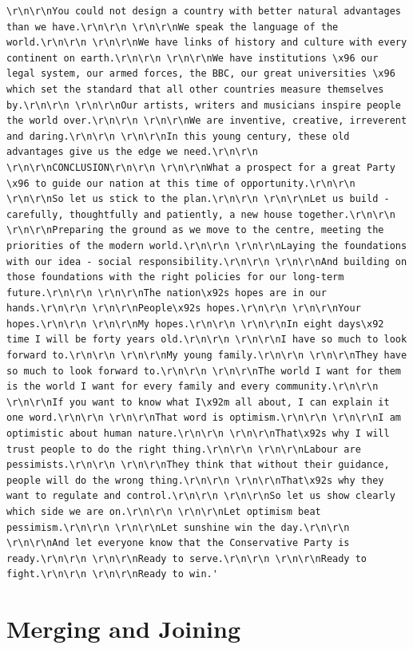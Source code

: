 \documentclass[
  letterpaper,
  DIV=11,
  numbers=noendperiod]{scrreprt}
\begin{document}
\begin{verbatim}
\r\n\r\nYou could not design a country with better natural advantages than we have.\r\n\r\n \r\n\r\nWe speak the language of the world.\r\n\r\n \r\n\r\nWe have links of history and culture with every continent on earth.\r\n\r\n \r\n\r\nWe have institutions \x96 our legal system, our armed forces, the BBC, our great universities \x96 which set the standard that all other countries measure themselves by.\r\n\r\n \r\n\r\nOur artists, writers and musicians inspire people the world over.\r\n\r\n \r\n\r\nWe are inventive, creative, irreverent and daring.\r\n\r\n \r\n\r\nIn this young century, these old advantages give us the edge we need.\r\n\r\n \r\n\r\nCONCLUSION\r\n\r\n \r\n\r\nWhat a prospect for a great Party \x96 to guide our nation at this time of opportunity.\r\n\r\n \r\n\r\nSo let us stick to the plan.\r\n\r\n \r\n\r\nLet us build - carefully, thoughtfully and patiently, a new house together.\r\n\r\n \r\n\r\nPreparing the ground as we move to the centre, meeting the priorities of the modern world.\r\n\r\n \r\n\r\nLaying the foundations with our idea - social responsibility.\r\n\r\n \r\n\r\nAnd building on those foundations with the right policies for our long-term future.\r\n\r\n \r\n\r\nThe nation\x92s hopes are in our hands.\r\n\r\n \r\n\r\nPeople\x92s hopes.\r\n\r\n \r\n\r\nYour hopes.\r\n\r\n \r\n\r\nMy hopes.\r\n\r\n \r\n\r\nIn eight days\x92 time I will be forty years old.\r\n\r\n \r\n\r\nI have so much to look forward to.\r\n\r\n \r\n\r\nMy young family.\r\n\r\n \r\n\r\nThey have so much to look forward to.\r\n\r\n \r\n\r\nThe world I want for them is the world I want for every family and every community.\r\n\r\n \r\n\r\nIf you want to know what I\x92m all about, I can explain it one word.\r\n\r\n \r\n\r\nThat word is optimism.\r\n\r\n \r\n\r\nI am optimistic about human nature.\r\n\r\n \r\n\r\nThat\x92s why I will trust people to do the right thing.\r\n\r\n \r\n\r\nLabour are pessimists.\r\n\r\n \r\n\r\nThey think that without their guidance, people will do the wrong thing.\r\n\r\n \r\n\r\nThat\x92s why they want to regulate and control.\r\n\r\n \r\n\r\nSo let us show clearly which side we are on.\r\n\r\n \r\n\r\nLet optimism beat pessimism.\r\n\r\n \r\n\r\nLet sunshine win the day.\r\n\r\n \r\n\r\nAnd let everyone know that the Conservative Party is ready.\r\n\r\n \r\n\r\nReady to serve.\r\n\r\n \r\n\r\nReady to fight.\r\n\r\n \r\n\r\nReady to win.'
\end{verbatim}


\hypertarget{merging-and-joining}{%
\chapter{Merging and Joining}\label{merging-and-joining}}
\end{document}
